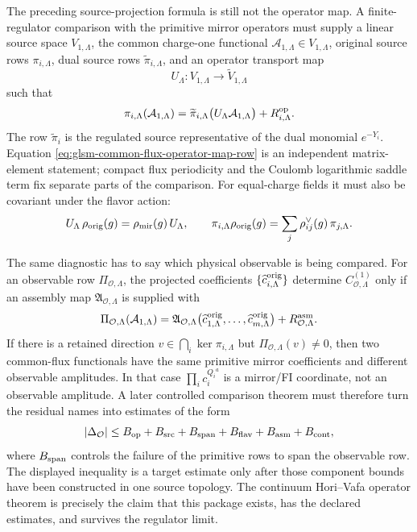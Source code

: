 \begin{remark}
\label{rem:glsm-common-flux-operator-map-diagnostic}
The preceding source-projection formula is still not the operator map.  A
finite-regulator comparison with the primitive mirror operators must supply a
linear source space \(V_{1,\Lambda}\), the common charge-one functional
\({\mathcal A}_{1,\Lambda}\in V_{1,\Lambda}\), original source rows
\(\pi_{i,\Lambda}\), dual source rows \(\widetilde\pi_{i,\Lambda}\), and an
operator transport map
\[
  U_\Lambda:V_{1,\Lambda}\longrightarrow \widetilde V_{1,\Lambda}
\]
such that
\begin{equation}
  \pi_{i,\Lambda}({\mathcal A}_{1,\Lambda})
  =
  \widetilde\pi_{i,\Lambda}
  \bigl(U_\Lambda{\mathcal A}_{1,\Lambda}\bigr)
  +R_{i,\Lambda}^{\rm op}.
  \label{eq:glsm-common-flux-operator-map-row}
\end{equation}
The row \(\widetilde\pi_i\) is the regulated source representative of the
dual monomial \(e^{-Y_i}\).  Equation
\eqref{eq:glsm-common-flux-operator-map-row} is an independent
matrix-element statement; compact flux periodicity and the Coulomb logarithmic
saddle term fix separate parts of the comparison.
For equal-charge fields it must also be covariant under the flavor action:
\[
  U_\Lambda\,\rho_{\rm orig}(g)
  =
  \rho_{\rm mir}(g)\,U_\Lambda,
  \qquad
  \pi_{i,\Lambda}\rho_{\rm orig}(g)
  =
  \sum_j \rho_{ij}^{\vee}(g)\,\pi_{j,\Lambda}.
\]

The same diagnostic has to say which physical observable is being compared.
For an observable row \(\Pi_{\mathcal O,\Lambda}\), the projected coefficients
\(\{\widehat c_{i,\Lambda}^{\rm orig}\}\) determine
\(C_{\mathcal O,\Lambda}^{(1)}\) only if an assembly map
\(\mathfrak A_{\mathcal O,\Lambda}\) is supplied with
\begin{equation}
  \Pi_{\mathcal O,\Lambda}({\mathcal A}_{1,\Lambda})
  =
  \mathfrak A_{\mathcal O,\Lambda}
  \bigl(
    \widehat c_{1,\Lambda}^{\rm orig},\ldots,
    \widehat c_{m,\Lambda}^{\rm orig}
  \bigr)
  +R_{\mathcal O,\Lambda}^{\rm asm}.
  \label{eq:glsm-common-flux-observable-assembly-row}
\end{equation}
If there is a retained direction
\(v\in\bigcap_i\ker\pi_{i,\Lambda}\) but
\(\Pi_{\mathcal O,\Lambda}(v)\ne0\), then two common-flux functionals have the
same primitive mirror coefficients and different observable amplitudes.  In
that case \(\prod_i c_i^{Q_i{}^a}\) is a mirror/FI coordinate, not an
observable amplitude.  A later controlled comparison theorem must therefore
turn the residual names into estimates of the form
\[
  |\Delta_{\mathcal O}|
  \le
  B_{\rm op}+B_{\rm src}+B_{\rm span}
  +B_{\rm flav}+B_{\rm asm}+B_{\rm cont},
\]
where \(B_{\rm span}\) controls the failure of the primitive rows to span the
observable row.  The displayed inequality is a target estimate only after
those component bounds have been constructed in one source topology.  The
continuum Hori--Vafa operator theorem is precisely the claim that this package
exists, has the declared estimates, and survives the regulator limit.
\end{remark}

